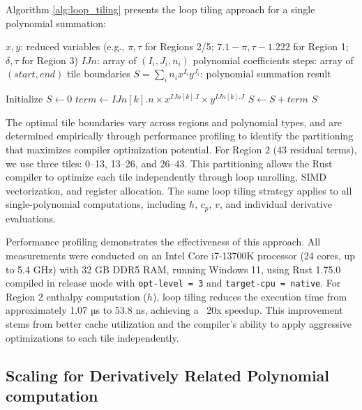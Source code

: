 \documentclass{article}
\begin{document}
Algorithm \ref{alg:loop_tiling} presents the loop tiling approach for a single polynomial summation:

\begin{algorithm}[H]
\caption{Loop Tiling for Single Polynomial Summation}
\label{alg:loop_tiling}
\begin{algorithmic}[1]
\REQUIRE $x, y$: reduced variables (e.g., $\pi, \tau$ for Regions 2/5; $7.1{-}\pi, \tau{-}1.222$ for Region 1; $\delta, \tau$ for Region 3)
\REQUIRE $IJn$: array of $(I_i, J_i, n_i)$ polynomial coefficients
\REQUIRE $\text{steps}$: array of $(start, end)$ tile boundaries
\ENSURE $S = \sum_i n_i x^{I_i} y^{J_i}$: polynomial summation result

\STATE Initialize $S \leftarrow 0$
        \STATE $term \leftarrow IJn[k].n \times x^{IJn[k].I} \times y^{IJn[k].J}$
        \STATE $S \leftarrow S + term$
    \ENDFOR
\ENDFOR
\RETURN $S$
\end{algorithmic}
\end{algorithm}

The optimal tile boundaries vary across regions and polynomial types, and are determined empirically through performance profiling to identify the partitioning that maximizes compiler optimization potential. For Region 2 (43 residual terms), we use three tiles: 0--13, 13--26, and 26--43. This partitioning allows the Rust compiler to optimize each tile independently through loop unrolling, SIMD vectorization, and register allocation. The same loop tiling strategy applies to all single-polynomial computations, including $h$, $c_p$, $v$, and individual derivative evaluations.

Performance profiling demonstrates the effectiveness of this approach. All measurements were conducted on an Intel Core i7-13700K processor (24 cores, up to 5.4 GHz) with 32 GB DDR5 RAM, running Windows 11, using Rust 1.75.0 compiled in release mode with \texttt{opt-level = 3} and \texttt{target-cpu = native}. For Region 2 enthalpy computation ($h$), loop tiling reduces the execution time from approximately 1.07 µs to 53.8 ns, achieving a ~20x speedup. This improvement stems from better cache utilization and the compiler's ability to apply aggressive optimizations to each tile independently.

\subsection{Scaling for Derivatively Related Polynomial computation}
\end{document}
